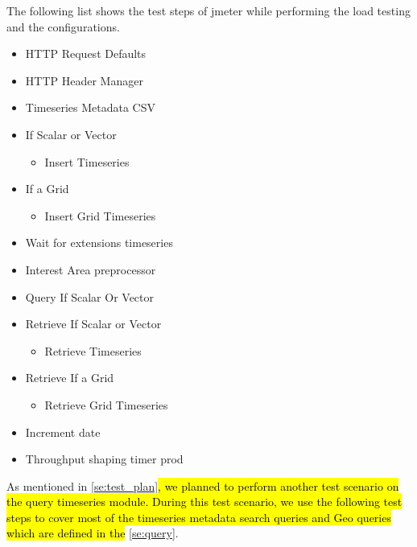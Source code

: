The following list shows the test steps of \acrshort{jmeter} while performing the load testing and the configurations.

\begin{itemize}
    \item HTTP Request Defaults
    \item HTTP Header Manager
    \item Timeseries Metadata CSV
    \item If Scalar or Vector
        \begin{itemize}
            \item Insert Timeseries
        \end{itemize}
    \item If a Grid
    \begin{itemize}
        \item Insert Grid Timeseries
    \end{itemize}
    \item Wait for extensions timeseries
    \item Interest Area preprocessor
    \item Query If Scalar Or Vector
    \item Retrieve If Scalar or Vector
        \begin{itemize}
            \item Retrieve Timeseries
        \end{itemize}
    \item Retrieve If a Grid
    \begin{itemize}
        \item Retrieve Grid Timeseries
    \end{itemize}
    \item Increment date
    \item Throughput shaping timer prod
\end{itemize}

As mentioned in \cref{se:test_plan}\hl{, we planned to perform another test scenario on the query timeseries module. During this test scenario, we use the following test steps to cover most of the timeseries metadata search queries and Geo queries which are defined in the} \cref{se:query}.

